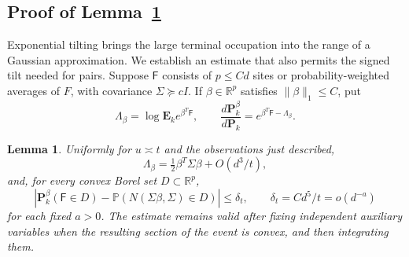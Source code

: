 \documentclass[11pt,a4paper]{article}
\numberwithin{equation}{section}
\newtheorem{lemma}[theorem]{Lemma}
\theoremstyle{remark}
\begin{document}
\subsection{Proof of Lemma~\ref{lem:bounded-tilt}}\label{sec:tilt}\label{sec:tiltnormal}
Exponential tilting brings the large terminal occupation into the range of a Gaussian approximation. We establish an estimate that also permits the signed tilt needed for pairs. Suppose $\mathsf F$ consists of $p\le Cd$ sites or probability-weighted averages of $F$, with covariance $\Sigma\succeq cI$. If $\beta\in\mathbb R^p$ satisfies $\|\beta\|_1\le C$, put
\[
\Lambda_\beta=\log\mathbf E_k e^{\beta^T\mathsf F},\qquad
\frac{d\mathbf P_k^\beta}{d\mathbf P_k}
=e^{\beta^T\mathsf F-\Lambda_\beta}.
\]
\begin{lemma}\label{lem:bounded-tilt}
Uniformly for $u\asymp t$ and the observations just described,
\begin{equation}\label{eq:6.12}
\Lambda_\beta=\tfrac12\beta^T\Sigma\beta+O(d^3/t),
\end{equation}
and, for every convex Borel set $D\subset\mathbb R^p$,
\begin{equation}\label{eq:6.13}
\left|\mathbf P_k^\beta(\mathsf F\in D)
-\mathbb P(N(\Sigma\beta,\Sigma)\in D)\right|
\le\delta_t,\qquad \delta_t=Cd^5/t=o(d^{-a})
\end{equation}
for each fixed $a>0$. The estimate remains valid after fixing independent auxiliary variables when the resulting section of the event is convex, and then integrating them.
\end{lemma}
\end{document}
